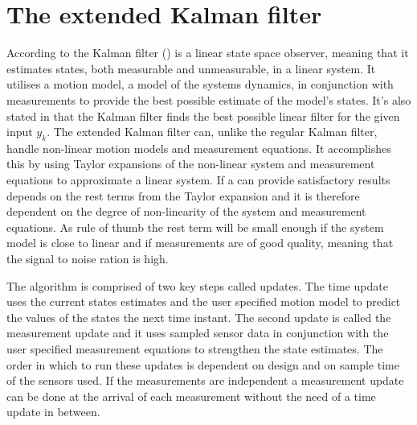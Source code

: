 \section{The extended Kalman filter}
According to \citet{sensorfusion} the Kalman filter (\abbrKF) is a linear state space observer, meaning that it estimates states, both measurable and unmeasurable, in a linear system. It utilises a motion model, a model of the systems dynamics, in conjunction with measurements to provide the best possible estimate of the model's states. It's also stated in \citet{sensorfusion} that the Kalman filter finds the best possible linear filter for the given input $y_{k}$. The extended Kalman filter can, unlike the regular Kalman filter, handle non-linear motion models and measurement equations. It accomplishes this by using Taylor expansions of the non-linear system and measurement equations to approximate a linear system. If a \abbrEKF can provide satisfactory results depends on the rest terms from the Taylor expansion and it is therefore dependent on the degree of non-linearity of the system and measurement equations\citep{sensorfusion}. As rule of thumb the rest term will be small enough if the system model is close to linear and if measurements are of good quality, meaning that the signal to noise ration is high\citep{sensorfusion}. 

The \abbrEKF algorithm is comprised of two key steps called updates.
The time update uses the current states estimates and the user specified motion model to predict the values of the states the next time instant. The second update is called the measurement update and it uses sampled sensor data in conjunction with the user specified measurement equations to strengthen the state estimates. 
The order in which to run these updates is dependent on design and on sample time of the sensors used. If the measurements are independent a measurement update can be done at the arrival of each measurement without the need of a time update in between\citep[p.170]{sensorfusion}.

